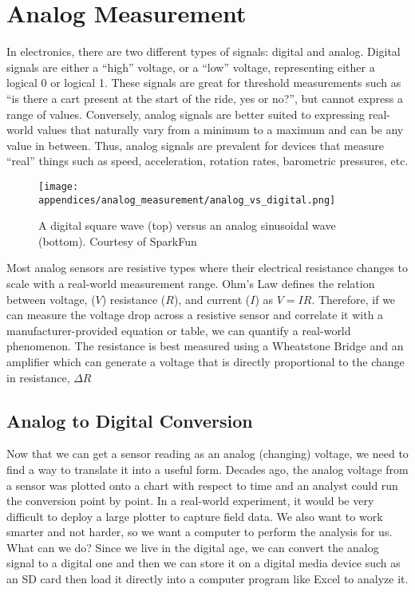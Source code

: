 \chapter{Analog Measurement} 
In electronics, there are two different types of signals: digital and analog.
Digital signals are either a ``high'' voltage, or a ``low'' voltage, representing either a logical 0 or logical 1.
These signals are great for threshold measurements such as ``is there a cart present at the start of the ride, yes or no?'', but cannot express a range of values.
Conversely, analog signals are better suited to expressing real-world values that naturally vary from a minimum to a maximum and can be any value in between.
Thus, analog signals are prevalent for devices that measure ``real'' things such as speed, acceleration, rotation rates, barometric pressures, etc.

\begin{figure}[h!]
    \caption[Analog versus digital waveforms]{A digital square wave (top) versus an analog sinusoidal wave (bottom).
    Courtesy of SparkFun \cite{SparkFun:AnalogDigital}}
    \centering
    \texttt{[image: appendices/analog\_measurement/analog\_vs\_digital.png]}
\end{figure}

Most analog sensors are resistive types where their electrical resistance changes to scale with a real-world measurement range.
Ohm's Law defines the relation between voltage, ($V$) resistance ($R$), and current ($I$) as $V=IR$.
Therefore, if we can measure the voltage drop across a resistive sensor and correlate it with a manufacturer-provided equation or table, we can quantify a real-world phenomenon.
The resistance is best measured using a Wheatstone Bridge and an amplifier which can generate a voltage that is directly proportional to the change in resistance, $\Delta R$

\section{Analog to Digital Conversion} 
Now that we can get a sensor reading as an analog (changing) voltage, we need to find a way to translate it into a useful form.
Decades ago, the analog voltage from a sensor was plotted onto a chart with respect to time and an analyst could run the conversion point by point.
In a real-world experiment, it would be very difficult to deploy a large plotter to capture field data.
We also want to work smarter and not harder, so we want a computer to perform the analysis for us. 
What can we do?
Since we live in the digital age, we can convert the analog signal to a digital one and then we can store it on a digital media device such as an SD card then load it directly into a computer program like Excel to analyze it.

